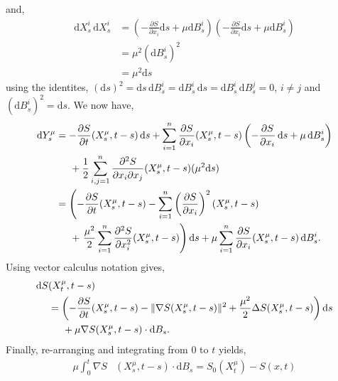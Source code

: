 \documentclass[a4paper,12pt,draft]{report}
\theoremstyle{remark}
\theoremstyle{definition}
\begin{document}
{and,
\begin{align}
\mathrm{d}X^{i}_{s}\,\mathrm{d}X^{i}_{s} & = \left(-\frac{\partial S}{\partial x_{i}}\mathrm{d}s + \mu\mathrm{d}B_s^i\right)\left(-\frac{\partial S}{\partial x_{i}}\mathrm{d}s + \mu\mathrm{d}B_s^i\right) \nonumber \\
& = \mu^2(\mathrm{d}B_s^i)^2 \nonumber \\
& = \mu^2\mathrm{d}s \nonumber
\end{align}
using the identites, $(\mathrm{d}s)^2 = \mathrm{d}s\,\mathrm{d}B_s^i = \mathrm{d}B_s^i\,\mathrm{d}s = \mathrm{d}B_s^i\,\mathrm{d}B_s^j = 0$, $i \ne j$ and $(\mathrm{d}B_s^i)^2 = \mathrm{d}s$.  We now have,
\begin{align}
\mathrm{d}Y^{\mu}_{s} & = -\frac{\partial S}{\partial t}(X^{\mu}_{s}, t - s)\,\mathrm{d}s + \sum_{i = 1}^n \frac{\partial S}{\partial x_{i}}(X^{\mu}_{s}, t - s)\left(-\frac{\partial S}{\partial x_{i}}\,\mathrm{d}s + \mu\,\mathrm{d}B_s^i\right)\nonumber\\
& \hspace{0.5cm} + \frac{1}{2}\sum_{i, j = 1}^{n} \frac{\partial^2 S}{\partial x_{i} \partial x_{j}}(X^{\mu}_{s}, t - s)(\mu^2\mathrm{d}s)\nonumber\\
& = \left(-\frac{\partial S}{\partial t}(X^{\mu}_{s}, t - s) - \sum_{i = 1}^n \left(\frac{\partial S}{\partial x_{i}}\right)^2(X^{\mu}_{s}, t - s)\right.\nonumber\\
& \hspace{0.5cm} + \left.\frac{\mu^2}{2}\sum_{i = 1}^{n} \frac{\partial^2 S}{\partial x_{i}^2}(X^{\mu}_{s}, t - s)\right)\mathrm{d}s + \mu\sum_{i = 1}^n \frac{\partial S}{\partial x_{i}}(X^{\mu}_{s}, t - s)\,\mathrm{d}B_s^i.\nonumber
\end{align}
Using vector calculus notation gives,
\begin{align}
\mathrm{d}S & (X^{\mu}_{t}, t - s)\nonumber\\
& = \left(-\frac{\partial S}{\partial t}(X^{\mu}_{s}, t - s) - \|\nabla S(X^{\mu}_{s}, t - s)\|^2 + \frac{\mu^2}{2}\Delta S(X^{\mu}_{s}, t - s)\right)\mathrm{d}s\nonumber\\
& \hspace{0.5cm} + \mu\nabla S(X^{\mu}_{s}, t - s)\cdot\mathrm{d}B_{s}.\nonumber
\end{align}
Finally, re-arranging and integrating from $0$ to $t$ yields,
\begin{align}
\mu\int _0^t\nabla S&(X^{\mu}_{s}, t - s)\cdot\mathrm{d}B_{s} = S_{0}(X^{\mu}_{t}) - S(x, t)\nonumber\\

\end{align}}
\end{document}
